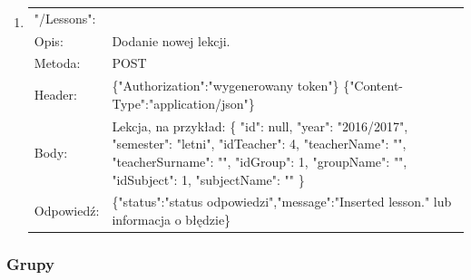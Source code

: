 \documentclass[12pt, titlepage]{article}
\begin{document}
\begin{enumerate}
	\item
	{\renewcommand{\arraystretch}{1.5}
	\begin{tabular}[t]{p{3cm} p{15cm}}
	\multicolumn{2}{l}{"/Lessons":} \\
	Opis: & Dodanie nowej lekcji. \\
	Metoda: & POST \\
	Header: & \{"Authorization":"wygenerowany token"\} \newline \{"Content-Type":"application/json"\} \\
	Body: & Lekcja, na przykład: \newline \{
   "id": null,\newline
            "year": "2016/2017",\newline
            "semester": "letni",\newline
            "idTeacher": 4,\newline
            "teacherName": "",\newline
            "teacherSurname": "",\newline
            "idGroup": 1,\newline
            "groupName": "",\newline
            "idSubject": 1,\newline
            "subjectName": ""
\} \\
	Odpowiedź: & \{"status":"status odpowiedzi",\newline "message":"Inserted lesson." lub informacja o błędzie\} \\
	\end{tabular}}
	
\end{enumerate}
	
\subsubsection{Grupy}
\end{document}
